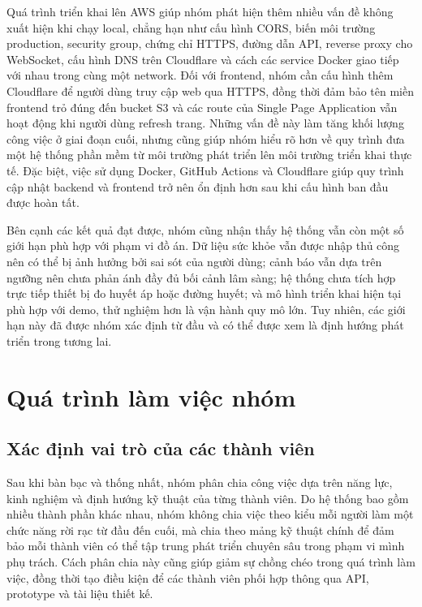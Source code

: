 \par Quá trình triển khai lên AWS giúp nhóm phát hiện thêm nhiều vấn đề không xuất hiện khi chạy local, chẳng hạn như cấu hình CORS, biến môi trường production, security group, chứng chỉ HTTPS, đường dẫn API, reverse proxy cho WebSocket, cấu hình DNS trên Cloudflare và cách các service Docker giao tiếp với nhau trong cùng một network. Đối với frontend, nhóm cần cấu hình thêm Cloudflare để người dùng truy cập web qua HTTPS, đồng thời đảm bảo tên miền frontend trỏ đúng đến bucket S3 và các route của Single Page Application vẫn hoạt động khi người dùng refresh trang. Những vấn đề này làm tăng khối lượng công việc ở giai đoạn cuối, nhưng cũng giúp nhóm hiểu rõ hơn về quy trình đưa một hệ thống phần mềm từ môi trường phát triển lên môi trường triển khai thực tế. Đặc biệt, việc sử dụng Docker, GitHub Actions và Cloudflare giúp quy trình cập nhật backend và frontend trở nên ổn định hơn sau khi cấu hình ban đầu được hoàn tất.

\par Bên cạnh các kết quả đạt được, nhóm cũng nhận thấy hệ thống vẫn còn một số giới hạn phù hợp với phạm vi đồ án. Dữ liệu sức khỏe vẫn được nhập thủ công nên có thể bị ảnh hưởng bởi sai sót của người dùng; cảnh báo vẫn dựa trên ngưỡng nên chưa phản ánh đầy đủ bối cảnh lâm sàng; hệ thống chưa tích hợp trực tiếp thiết bị đo huyết áp hoặc đường huyết; và mô hình triển khai hiện tại phù hợp với demo, thử nghiệm hơn là vận hành quy mô lớn. Tuy nhiên, các giới hạn này đã được nhóm xác định từ đầu và có thể được xem là định hướng phát triển trong tương lai.

\section{Quá trình làm việc nhóm}

\subsection{Xác định vai trò của các thành viên}
\par Sau khi bàn bạc và thống nhất, nhóm phân chia công việc dựa trên năng lực, kinh nghiệm và định hướng kỹ thuật của từng thành viên. Do hệ thống bao gồm nhiều thành phần khác nhau, nhóm không chia việc theo kiểu mỗi người làm một chức năng rời rạc từ đầu đến cuối, mà chia theo mảng kỹ thuật chính để đảm bảo mỗi thành viên có thể tập trung phát triển chuyên sâu trong phạm vi mình phụ trách. Cách phân chia này cũng giúp giảm sự chồng chéo trong quá trình làm việc, đồng thời tạo điều kiện để các thành viên phối hợp thông qua API, prototype và tài liệu thiết kế.

